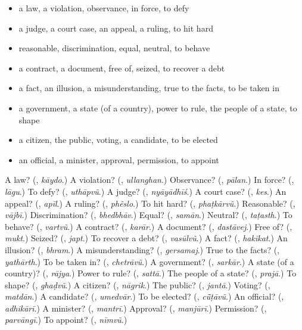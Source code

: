 \begin{itemize}
\raggedright
  \item a law, a violation, observance, in force, to defy
  \item a judge, a court case, an appeal, a ruling, to hit hard
  \item reasonable, discrimination, equal, neutral, to behave
  \item a contract, a document, free of, seized, to recover a debt
  \item a fact, an illusion, a misunderstanding, true to the facts, to be taken in
  \item a government, a state (of a country), power to rule, the people of a state, to shape
  \item a citizen, the public, voting, a candidate, to be elected
  \item an official, a minister, approval, permission, to appoint
\end{itemize}

\begin{tcolorbox}[breakable,colback=teal!4,colframe=teal!35!black,title={Before you move on}]
A law? (\textbf{}, \emph{kāydo}.) A violation? (\textbf{}, \emph{ullanghan}.) Observance? (\textbf{}, \emph{pālan}.) In force? (\textbf{}, \emph{lāgu}.) To defy? (\textbf{}, \emph{uthāpvũ}.) A judge? (\textbf{}, \emph{nyāyādhīś}.) A court case? (\textbf{}, \emph{kes}.) An appeal? (\textbf{}, \emph{apīl}.) A ruling? (\textbf{}, \emph{phẽslo}.) To hit hard? (\textbf{}, \emph{phaṭkārvũ}.) Reasonable? (\textbf{}, \emph{vājbī}.) Discrimination? (\textbf{}, \emph{bhedbhāv}.) Equal? (\textbf{}, \emph{samān}.) Neutral? (\textbf{}, \emph{taṭasth}.) To behave? (\textbf{}, \emph{vartvũ}.) A contract? (\textbf{}, \emph{karār}.) A document? (\textbf{}, \emph{dastāvej}.) Free of? (\textbf{}, \emph{mukt}.) Seized? (\textbf{}, \emph{japt}.) To recover a debt? (\textbf{}, \emph{vasūlvũ}.) A fact? (\textbf{}, \emph{hakīkat}.) An illusion? (\textbf{}, \emph{bhram}.) A misunderstanding? (\textbf{}, \emph{gersamaj}.) True to the facts? (\textbf{}, \emph{yathārth}.) To be taken in? (\textbf{}, \emph{chetrāvũ}.) A government? (\textbf{}, \emph{sarkār}.) A state (of a country)? (\textbf{}, \emph{rājya}.) Power to rule? (\textbf{}, \emph{sattā}.) The people of a state? (\textbf{}, \emph{prajā}.) To shape? (\textbf{}, \emph{ghaḍvũ}.) A citizen? (\textbf{}, \emph{nāgrik}.) The public? (\textbf{}, \emph{jantā}.) Voting? (\textbf{}, \emph{matdān}.) A candidate? (\textbf{}, \emph{umedvār}.) To be elected? (\textbf{}, \emph{cū̃ṭāvũ}.) An official? (\textbf{}, \emph{adhikārī}.) A minister? (\textbf{}, \emph{mantrī}.) Approval? (\textbf{}, \emph{manjūrī}.) Permission? (\textbf{}, \emph{parvāngī}.) To appoint? (\textbf{}, \emph{nīmvũ}.)
\end{tcolorbox}
